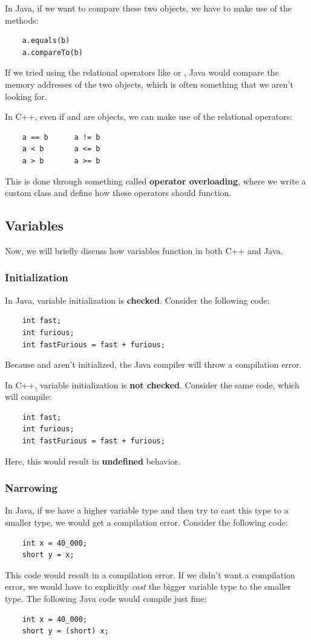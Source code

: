 \documentclass[letterpaper]{article}
\begin{document}
\bigskip 

In Java, if we want to compare these two objects, we have to make use of the methods: 
\begin{verbatim}
    a.equals(b)
    a.compareTo(b)
\end{verbatim}
If we tried using the relational operators like \code{==} or \code{!=}, Java would compare the memory addresses of the two objects, which is often something that we aren't looking for.

\bigskip 

In C++, even if  and  are objects, we can make use of the relational operators:
\begin{verbatim}
    a == b      a != b
    a < b       a <= b
    a > b       a >= b
\end{verbatim}
This is done through something called \textbf{operator overloading}, where we write a custom class and define how these operators should function.


\subsection{Variables}
Now, we will briefly discuss how variables function in both C++ and Java. 

\subsubsection{Initialization}
In Java, variable initialization is \textbf{checked}. Consider the following code: 
\begin{verbatim}
    int fast;
    int furious; 
    int fastFurious = fast + furious;
\end{verbatim}
Because  and  aren't initialized, the Java compiler will throw a compilation error. 

\bigskip 

In C++, variable initialization is \textbf{not checked}. Consider the same code, which will compile:
\begin{verbatim}
    int fast;
    int furious; 
    int fastFurious = fast + furious;
\end{verbatim}
Here, this would result in \textbf{undefined} behavior.

\subsubsection{Narrowing}
In Java, if we have a higher variable type and then try to cast this type to a smaller type, we would get a compilation error. Consider the following code:
\begin{verbatim}
    int x = 40_000;
    short y = x;
\end{verbatim}
This code would result in a compilation error. If we didn't want a compilation error, we would have to explicitly \emph{cast} the bigger variable type to the smaller type. The following Java code would compile just fine: 
\begin{verbatim}
    int x = 40_000;
    short y = (short) x;
\end{verbatim}
\end{document}
